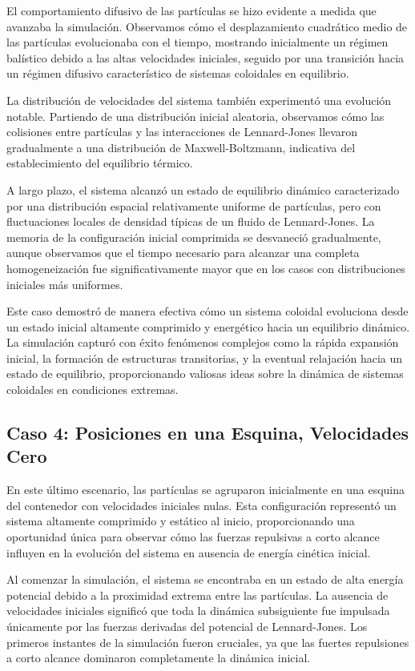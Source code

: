 \documentclass[twocolumn]{article}
\begin{document}
El comportamiento difusivo de las partículas se hizo evidente a medida que avanzaba la simulación. Observamos cómo el desplazamiento cuadrático medio de las partículas evolucionaba con el tiempo, mostrando inicialmente un régimen balístico debido a las altas velocidades iniciales, seguido por una transición hacia un régimen difusivo característico de sistemas coloidales en equilibrio.

La distribución de velocidades del sistema también experimentó una evolución notable. Partiendo de una distribución inicial aleatoria, observamos cómo las colisiones entre partículas y las interacciones de Lennard-Jones llevaron gradualmente a una distribución de Maxwell-Boltzmann, indicativa del establecimiento del equilibrio térmico.

A largo plazo, el sistema alcanzó un estado de equilibrio dinámico caracterizado por una distribución espacial relativamente uniforme de partículas, pero con fluctuaciones locales de densidad típicas de un fluido de Lennard-Jones. La memoria de la configuración inicial comprimida se desvaneció gradualmente, aunque observamos que el tiempo necesario para alcanzar una completa homogeneización fue significativamente mayor que en los casos con distribuciones iniciales más uniformes.

Este caso demostró de manera efectiva cómo un sistema coloidal evoluciona desde un estado inicial altamente comprimido y energético hacia un equilibrio dinámico. La simulación capturó con éxito fenómenos complejos como la rápida expansión inicial, la formación de estructuras transitorias, y la eventual relajación hacia un estado de equilibrio, proporcionando valiosas ideas sobre la dinámica de sistemas coloidales en condiciones extremas.

\subsection*{Caso 4: Posiciones en una Esquina, Velocidades Cero}

En este último escenario, las partículas se agruparon inicialmente en una esquina del contenedor con velocidades iniciales nulas. Esta configuración representó un sistema altamente comprimido y estático al inicio, proporcionando una oportunidad única para observar cómo las fuerzas repulsivas a corto alcance influyen en la evolución del sistema en ausencia de energía cinética inicial.

Al comenzar la simulación, el sistema se encontraba en un estado de alta energía potencial debido a la proximidad extrema entre las partículas. La ausencia de velocidades iniciales significó que toda la dinámica subsiguiente fue impulsada únicamente por las fuerzas derivadas del potencial de Lennard-Jones. Los primeros instantes de la simulación fueron cruciales, ya que las fuertes repulsiones a corto alcance dominaron completamente la dinámica inicial.
\end{document}
